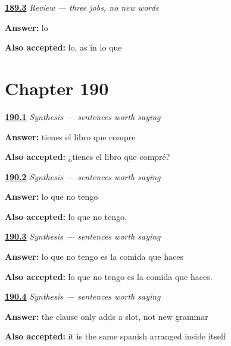 \noindent\begin{minipage}[t]{\linewidth}
\raggedright
\hyperlink{review-ES-C53-repaso-que-hole}{\textbf{189.3}} \emph{Review — three jobs, no new words}\par
\small \textbf{Answer:} lo\par
\footnotesize \textbf{Also accepted:} lo, as in lo que
\end{minipage}\par\medskip

\section*{Chapter 190}

\noindent\begin{minipage}[t]{\linewidth}
\raggedright
\hyperlink{review-ES-C53-sintesis-frases-largas-ask}{\textbf{190.1}} \emph{Synthesis — sentences worth saying}\par
\small \textbf{Answer:} tienes el libro que compre\par
\footnotesize \textbf{Also accepted:} ¿tienes el libro que compré?
\end{minipage}\par\medskip

\noindent\begin{minipage}[t]{\linewidth}
\raggedright
\hyperlink{review-ES-C53-sintesis-frases-largas-hole}{\textbf{190.2}} \emph{Synthesis — sentences worth saying}\par
\small \textbf{Answer:} lo que no tengo\par
\footnotesize \textbf{Also accepted:} lo que no tengo.
\end{minipage}\par\medskip

\noindent\begin{minipage}[t]{\linewidth}
\raggedright
\hyperlink{review-ES-C53-sintesis-frases-largas-full}{\textbf{190.3}} \emph{Synthesis — sentences worth saying}\par
\small \textbf{Answer:} lo que no tengo es la comida que haces\par
\footnotesize \textbf{Also accepted:} lo que no tengo es la comida que haces.
\end{minipage}\par\medskip

\noindent\begin{minipage}[t]{\linewidth}
\raggedright
\hyperlink{review-ES-C53-sintesis-frases-largas-why}{\textbf{190.4}} \emph{Synthesis — sentences worth saying}\par
\small \textbf{Answer:} the clause only adds a slot, not new grammar\par
\footnotesize \textbf{Also accepted:} it is the same spanish arranged inside itself
\end{minipage}\par\medskip

